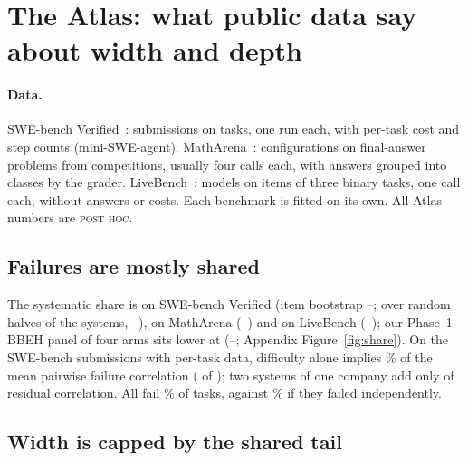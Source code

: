 \documentclass{article}
\newcommand{\status}[1]{{\upshape\textsc{\small #1}}}
\begin{document}
\section{The Atlas: what public data say about width and depth}
\label{sec:atlas}

\paragraph{Data.} SWE-bench Verified~\cite{jimenez2024swebench}:  submissions on
 tasks, one run each,  with per-task cost and step counts (mini-SWE-agent).
MathArena~\cite{balunovic2025matharena}:  configurations on  final-answer
problems from  competitions, usually four calls each, with answers grouped into classes by the
grader. LiveBench~\cite{white2024livebench}:  models on  items of three binary
tasks, one call each, without answers or costs. Each benchmark is fitted on its own. All Atlas numbers are
\status{post hoc}.

\subsection{Failures are mostly shared}

The systematic share is  on SWE-bench Verified (item bootstrap --; over
 random halves of the systems, --),  on MathArena
(--) and  on LiveBench (--); our Phase~1 BBEH panel
of four arms sits lower at  (--; Appendix Figure~\ref{fig:share}). On the
 SWE-bench submissions with per-task data, difficulty alone implies \% of the
mean pairwise failure correlation ( of ); two systems of one company add only
 of residual correlation. All  fail \% of tasks, against
\% if they failed independently.

\subsection{Width is capped by the shared tail}
\end{document}
